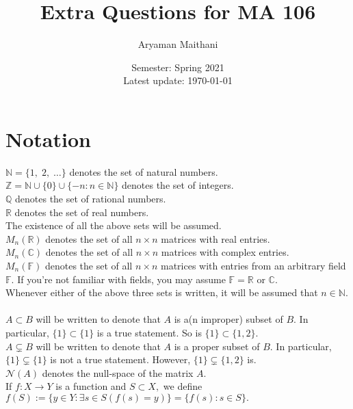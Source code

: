 \documentclass[12pt]{article}
\title{Extra Questions for MA 106}
\author{Aryaman Maithani}%
\date{Semester: Spring 2021\\ Latest update: \today}
\begin{document}
\maketitle
\tableofcontents
\hrulefill
\setcounter{section}{-1}
\section{Notation}

$\mathbb{N} = \{1,\; 2,\; \ldots\}$ denotes the set of natural numbers.\\
$\mathbb{Z} = \mathbb{N} \cup \{0\} \cup \{-n : n\in\mathbb{N}\}$ denotes the set of integers.\\
$\mathbb{Q}$ denotes the set of rational numbers.\\
$\mathbb{R}$ denotes the set of real numbers.\\
The existence of all the above sets will be assumed.\\
$M_n(\mathbb{R})$ denotes the set of all $n\times n$ matrices with real entries.\\
$M_n(\mathbb{C})$ denotes the set of all $n\times n$ matrices with complex entries.\\
$M_n(\mathbb{F})$ denotes the set of all $n\times n$ matrices with entries from an arbitrary field $\mathbb{F}.$ If you're not familiar with fields, you may assume $\mathbb{F} = \mathbb{R}$ or $\mathbb{C}.$\\
Whenever either of the above three sets is written, it will be assumed that $n \in \mathbb{N}.$\\~\\
$A \subset B$ will be written to denote that $A$ is a(n improper) subset of $B.$ In particular, $\{1\} \subset \{1\}$ is a true statement. So is $\{1\} \subset \{1, 2\}.$\\
$A \subsetneq B$ will be written to denote that $A$ is a proper subset of $B.$ In particular, $\{1\} \subsetneq \{1\}$ is not a true statement. However, $\{1\} \subsetneq \{1, 2\}$ is.\\
$\mathcal{N}(A)$ denotes the null-space of the matrix $A.$\\
If $f:X\to Y$ is a function and $S \subset X,$ we define $f(S) := \{y \in Y : \exists s \in S(f(s) = y)\} = \{f(s) : s \in S\}.$

\hrulefill
\end{document}
